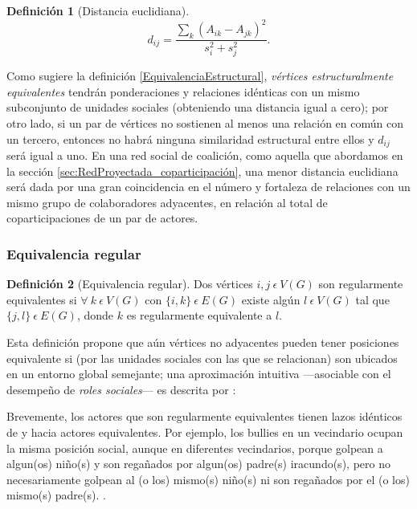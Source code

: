 \documentclass[letterpaper, 11pt]{book}
\theoremstyle{definition}
\newtheorem{definition}{Definición}[chapter]
\theoremstyle{remark}
\begin{document}
\begin{definition}[Distancia euclidiana]
\label{distancia_euclidiana}
    \begin{equation}
	d_{ij} = \frac{\sum_{k} (A_{ik}-A_{jk})^2}{s_{i}^2+s_{j}^2}. 
    \end{equation} 
\end{definition}

Como sugiere la definición \ref{EquivalenciaEstructural}, \emph{vértices estructuralmente equivalentes} tendrán ponderaciones y relaciones idénticas con un mismo subconjunto de unidades sociales (obteniendo una distancia igual a cero); por otro lado, si un par de vértices no sostienen al menos una relación en común con un tercero, entonces no habrá ninguna similaridad estructural entre ellos y $d_{ij}$ será igual a uno. 
En una red social de coalición, como aquella que abordamos en la sección \ref{sec:RedProyectada_coparticipación}, una menor distancia euclidiana será dada por una gran coincidencia en el número y fortaleza de relaciones con un mismo grupo de colaboradores adyacentes, en relación al total de coparticipaciones de un par de actores. 




\subsubsection{Equivalencia regular}
\label{sec:EquivalenciaRegular}

\begin{definition}[Equivalencia regular]
\label{EquivalenciaRegular}
    Dos vértices $i, j \ \epsilon \ V(G)$ son regularmente equivalentes si $\forall \ k \ \epsilon \ V(G)$ con $\{i,k\} \ \epsilon \ E(G) $ existe algún $  l  \  \epsilon \ V(G)$ tal que  $\{j,l\} \ \epsilon \ E(G)$, donde $k$ es regularmente equivalente a $l$.
\end{definition}

Esta definición propone que aún vértices no adyacentes pueden tener posiciones equivalente si (por las unidades sociales con las que se relacionan) son ubicados en un entorno global semejante; una aproximación intuitiva ---asociable con el desempeño de \emph{roles sociales}--- es descrita por \citet{1994_Wasserman_SNA}:

\begin{center}
    \begin{minipage}{0.9\linewidth}
        {\setlength{\parindent}{12pt}\small
         Brevemente, los actores que son regularmente equivalentes tienen lazos idénticos de y hacia actores equivalentes. 
         Por ejemplo, los bullies en un vecindario ocupan la misma posición social, aunque en diferentes vecindarios, porque golpean a algun(os) niño(s) y son regañados por algun(os) padre(s) iracundo(s), pero no necesariamente golpean al (o los) mismo(s) niño(s) ni son regañados por el (o los) mismo(s) padre(s).
         \normalsize \citep[474]{1994_Wasserman_SNA}.
        }
    \end{minipage}
\end{center}
\end{document}
